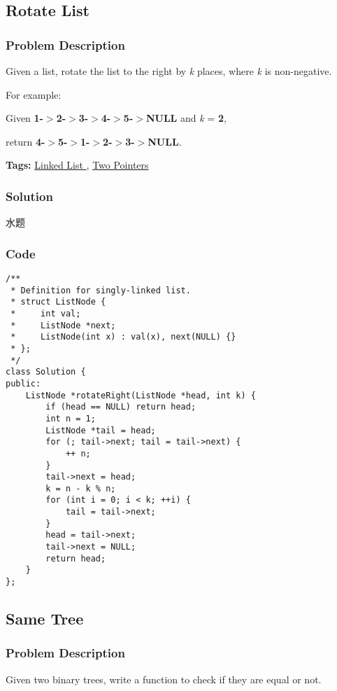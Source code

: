 \documentclass{article}
\begin{document}
\begin{CJK*}{UTF8}{gkai}
\subsection{ Rotate List }
\label{ Rotate List }

\subsubsection*{Problem Description}
Given a list, rotate the list to the right by \emph{k} places, where \emph{k} is non-negative.

For example:


Given \textbf{1-$>$2-$>$3-$>$4-$>$5-$>$NULL} and \emph{k} = \textbf{2},


return \textbf{4-$>$5-$>$1-$>$2-$>$3-$>$NULL}.


\textbf{Tags: }
\hyperref[ Linked List ]{ Linked List },  \hyperref[ Two Pointers ]{ Two Pointers }



\subsubsection*{Solution}
水题

\subsubsection*{Code}
\begin{lstlisting}
/**
 * Definition for singly-linked list.
 * struct ListNode {
 *     int val;
 *     ListNode *next;
 *     ListNode(int x) : val(x), next(NULL) {}
 * };
 */
class Solution {
public:
    ListNode *rotateRight(ListNode *head, int k) {
        if (head == NULL) return head;
        int n = 1;
        ListNode *tail = head;
        for (; tail->next; tail = tail->next) {
            ++ n;
        }
        tail->next = head;
        k = n - k % n;
        for (int i = 0; i < k; ++i) {
            tail = tail->next;
        }
        head = tail->next;
        tail->next = NULL;
        return head;
    }
}; 
\end{lstlisting}


\subsection{ Same Tree }
\label{ Same Tree }

\subsubsection*{Problem Description}
Given two binary trees, write a function to check if they are equal or not.


\end{CJK*}
\end{document}
